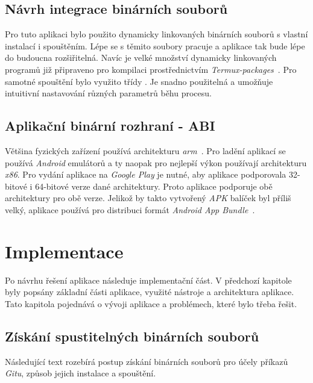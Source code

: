 \section{Návrh integrace binárních souborů}
Pro tuto aplikaci bylo použito dynamicky linkovaných binárních souborů s vlastní instalací i spouštěním. Lépe se s těmito soubory pracuje a aplikace tak bude lépe do budoucna rozšiřitelná. Navíc je velké množství dynamicky linkovaných programů již připraveno pro kompilaci prostřednictvím \emph{Termux-packages}~. Pro samotné spouštění bylo využito třídy . Je snadno použitelná a umožňuje intuitivní nastavování různých parametrů běhu procesu.

\section{Aplikační binární rozhraní - ABI}
Většina fyzických zařízení používá architekturu \emph{arm}~\cite{ABIs}. Pro ladění aplikací se používá \emph{Android} emulátorů a ty naopak pro nejlepší výkon používají architekturu \emph{x86}. Pro vydání aplikace na \emph{Google Play} je nutné, aby aplikace podporovala 32-bitové i 64-bitové verze dané architektury. Proto aplikace podporuje obě architektury pro obě verze. Jelikož by takto vytvořený \emph{APK} balíček byl příliš velký, aplikace používá pro distribuci formát \emph{Android App Bundle}~\label{abi_aab}.
    
\chapter{Implementace}
Po návrhu řešení aplikace následuje implementační část. V předchozí kapitole byly popsány základní části aplikace, využité nástroje a architektura aplikace. Tato kapitola pojednává o vývoji aplikace a problémech, které bylo třeba řešit.

\section{Získání spustitelných binárních souborů}
Následující text rozebírá postup získání binárních souborů pro účely příkazů \emph{Gitu}, způsob jejich instalace a spouštění.

